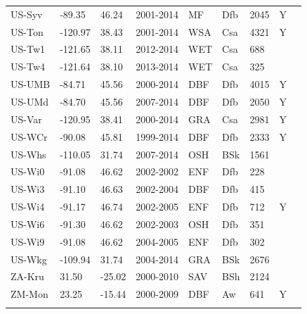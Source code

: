 \documentclass[gmd, manuscript]{copernicus}
\begin{document}
\begin{table}
\begin{tabular}{lllllllll}
  US-Syv & -89.35 & 46.24 & 2001-2014 & MF & Dfb & 2045 & Y & \citet{US-Syv} \\ 
  US-Ton & -120.97 & 38.43 & 2001-2014 & WSA & Csa & 4321 & Y & \citet{US-Ton} \\ 
  US-Tw1 & -121.65 & 38.11 & 2012-2014 & WET & Csa & 688 &  & \citet{US-Tw1} \\ 
  US-Tw4 & -121.64 & 38.10 & 2013-2014 & WET & Csa & 325 &  & \citet{US-Tw4} \\ 
  US-UMB & -84.71 & 45.56 & 2000-2014 & DBF & Dfb & 4015 & Y & \citet{US-UMB} \\ 
  US-UMd & -84.70 & 45.56 & 2007-2014 & DBF & Dfb & 2050 & Y & \citet{US-UMd} \\ 
  US-Var & -120.95 & 38.41 & 2000-2014 & GRA & Csa & 2981 & Y & \citet{US-Var} \\ 
  US-WCr & -90.08 & 45.81 & 1999-2014 & DBF & Dfb & 2333 & Y & \citet{US-WCr} \\ 
  US-Whs & -110.05 & 31.74 & 2007-2014 & OSH & BSk & 1561 &  & \citet{US-Whs} \\ 
  US-Wi0 & -91.08 & 46.62 & 2002-2002 & ENF & Dfb & 228 &  & \citet{US-Wi0} \\ 
  US-Wi3 & -91.10 & 46.63 & 2002-2004 & DBF & Dfb & 415 &  & \citet{US-Wi3} \\ 
  US-Wi4 & -91.17 & 46.74 & 2002-2005 & ENF & Dfb & 712 & Y & \citet{US-Wi4} \\ 
  US-Wi6 & -91.30 & 46.62 & 2002-2003 & OSH & Dfb & 351 &  & \citet{US-Wi6} \\ 
  US-Wi9 & -91.08 & 46.62 & 2004-2005 & ENF & Dfb & 302 &  & \citet{US-Wi9} \\ 
  US-Wkg & -109.94 & 31.74 & 2004-2014 & GRA & BSk & 2676 &  & \citet{US-Wkg} \\ 
  ZA-Kru & 31.50 & -25.02 & 2000-2010 & SAV & BSh & 2124 &  & \citet{ZA-Kru} \\ 
  ZM-Mon & 23.25 & -15.44 & 2000-2009 & DBF & Aw & 641 & Y & \citet{ZM-Mon} \\ 
  \bottomhline
\end{tabular}
\label{tab:sites}
\end{table}
\end{document}
